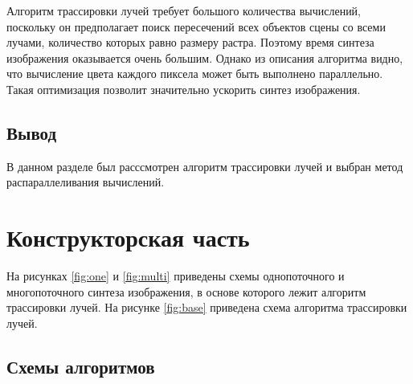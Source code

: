 \documentclass[12pt]{report}
\begin{document}
Алгоритм трассировки лучей требует большого количества вычислений, поскольку он предполагает поиск пересечений всех объектов сцены со всеми лучами, количество которых равно размеру растра. Поэтому время синтеза изображения оказывается очень большим. Однако из описания алгоритма видно, что вычисление цвета каждого пиксела может быть выполнено параллельно. Такая оптимизация позволит значительно ускорить синтез изображения.

\section{Вывод}
	В данном разделе был расссмотрен алгоритм трассировки лучей и выбран метод распараллеливания вычислений.
\clearpage

\chapter{Конструкторская часть}

На рисунках \ref{fig:one} и \ref{fig:multi} приведены схемы однопоточного и многопоточного синтеза изображения, в основе которого лежит алгоритм трассировки лучей. На рисунке  \ref{fig:base} приведена схема алгоритма трассировки лучей.

\section{Схемы алгоритмов}
\end{document}
